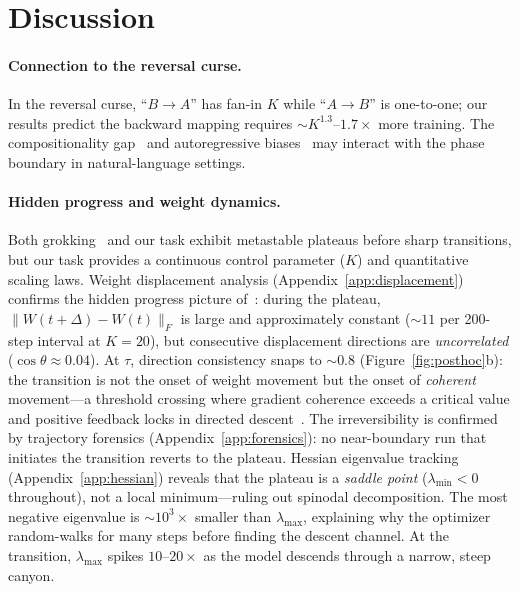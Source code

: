 \documentclass{article}
\begin{document}
\vspace{-3pt}
\section{Discussion}
\label{sec:discussion}
\vspace{-2pt}

\paragraph{Connection to the reversal curse.}
In the reversal curse, ``$B \to A$'' has fan-in $K$ while ``$A \to B$'' is one-to-one; our results predict the backward mapping requires ${\sim}K^{1.3}$--$1.7\times$ more training.
The compositionality gap~\citep{press2023measuring} and autoregressive biases~\citep{mccoy2023embers} may interact with the phase boundary in natural-language settings.

\paragraph{Hidden progress and weight dynamics.}
Both grokking~\citep{power2022grokking, nanda2023progress} and our task exhibit metastable plateaus before sharp transitions, but our task provides a continuous control parameter ($K$) and quantitative scaling laws.
Weight displacement analysis (Appendix~\ref{app:displacement}) confirms the hidden progress picture of~\citet{barak2022hidden}: during the plateau, $\|W(t{+}\Delta) - W(t)\|_F$ is large and approximately constant (${\sim}11$ per 200-step interval at $K{=}20$), but consecutive displacement directions are \emph{uncorrelated} ($\cos\theta \approx 0.04$).
At $\tau$, direction consistency snaps to ${\sim}0.8$ (Figure~\ref{fig:posthoc}b): the transition is not the onset of weight movement but the onset of \emph{coherent} movement---a threshold crossing where gradient coherence exceeds a critical value and positive feedback locks in directed descent~\citep{chen2024hidden}.
The irreversibility is confirmed by trajectory forensics (Appendix~\ref{app:forensics}): no near-boundary run that initiates the transition reverts to the plateau.
Hessian eigenvalue tracking (Appendix~\ref{app:hessian}) reveals that the plateau is a \emph{saddle point} ($\lambda_\text{min} < 0$ throughout), not a local minimum---ruling out spinodal decomposition.
The most negative eigenvalue is ${\sim}10^3{\times}$ smaller than $\lambda_\text{max}$, explaining why the optimizer random-walks for many steps before finding the descent channel.
At the transition, $\lambda_\text{max}$ spikes $10$--$20{\times}$ as the model descends through a narrow, steep canyon.
\end{document}
